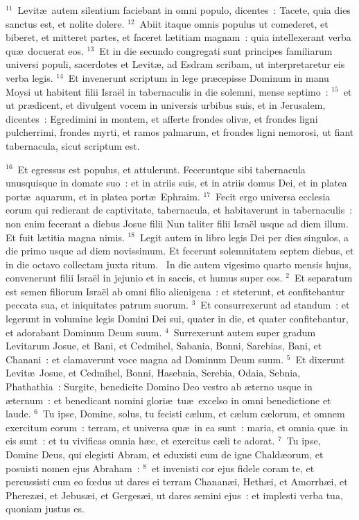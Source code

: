 ${}^{11}$~Levit\ae\ autem silentium faciebant in omni populo, dicentes~: Tacete, quia dies sanctus est, et nolite dolere.
${}^{12}$~Abiit itaque omnis populus ut comederet, et biberet, et mitteret partes, et faceret l\ae titiam magnam~: quia intellexerant verba qu\ae\ docuerat eos.
${}^{13}$~Et in die secundo congregati sunt principes familiarum universi populi, sacerdotes et Levit\ae , ad Esdram scribam, ut interpretaretur eis verba legis.
${}^{14}$~Et invenerunt scriptum in lege pr\ae cepisse Dominum in manu Moysi ut habitent filii Isra\"el in tabernaculis in die solemni, mense septimo~:
${}^{15}$~et ut pr\ae dicent, et divulgent vocem in universis urbibus suis, et in Jerusalem, dicentes~: Egredimini in montem, et afferte frondes oliv\ae , et frondes ligni pulcherrimi, frondes myrti, et ramos palmarum, et frondes ligni nemorosi, ut fiant tabernacula, sicut scriptum est.


${}^{16}$~Et egressus est populus, et attulerunt. Feceruntque sibi tabernacula unusquisque in domate suo~: et in atriis suis, et in atriis domus Dei, et in platea port\ae\ aquarum, et in platea port\ae\ Ephraim.
${}^{17}$~Fecit ergo universa ecclesia eorum qui redierant de captivitate, tabernacula, et habitaverunt in tabernaculis~: non enim fecerant a diebus Josue filii Nun taliter filii Isra\"el usque ad diem illum. Et fuit l\ae titia magna nimis.
${}^{18}$~Legit autem in libro legis Dei per dies singulos, a die primo usque ad diem novissimum. Et fecerunt solemnitatem septem diebus, et in die octavo collectam juxta ritum.
~\lettrine[lines=10,image=true,loversize=0.05,lraise=-0.03]{I}{}n die autem vigesimo quarto mensis hujus, convenerunt filii Isra\"el in jejunio et in saccis, et humus super eos.
${}^{2}$~Et separatum est semen filiorum Isra\"el ab omni filio alienigena~: et steterunt, et confitebantur peccata sua, et iniquitates patrum suorum.
${}^{3}$~Et consurrexerunt ad standum~: et legerunt in volumine legis Domini Dei sui, quater in die, et quater confitebantur, et adorabant Dominum Deum suum.
${}^{4}$~Surrexerunt autem super gradum Levitarum Josue, et Bani, et Cedmihel, Sabania, Bonni, Sarebias, Bani, et Chanani~: et clamaverunt voce magna ad Dominum Deum suum.
${}^{5}$~Et dixerunt Levit\ae\ Josue, et Cedmihel, Bonni, Hasebnia, Serebia, Odaia, Sebnia, Phathathia~: Surgite, benedicite Domino Deo vestro ab \ae terno usque in \ae ternum~: et benedicant nomini glori\ae\ tu\ae\ excelso in omni benedictione et laude.
${}^{6}$~Tu ipse, Domine, solus, tu fecisti c\ae lum, et c\ae lum c\ae lorum, et omnem exercitum eorum~: terram, et universa qu\ae\ in ea sunt~: maria, et omnia qu\ae\ in eis sunt~: et tu vivificas omnia h\ae c, et exercitus c\ae li te adorat.
${}^{7}$~Tu ipse, Domine Deus, qui elegisti Abram, et eduxisti eum de igne Chald\ae orum, et posuisti nomen ejus Abraham~:
${}^{8}$~et invenisti cor ejus fidele coram te, et percussisti cum eo fœdus ut dares ei terram Chanan\ae i, Heth\ae i, et Amorrh\ae i, et Pherez\ae i, et Jebus\ae i, et Gerges\ae i, ut dares semini ejus~: et implesti verba tua, quoniam justus es.


